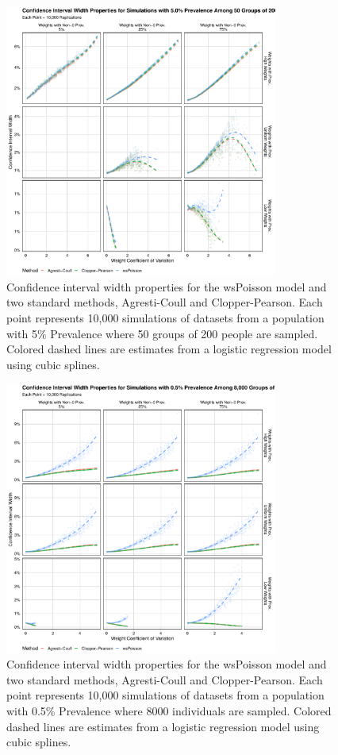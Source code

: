 \documentclass[AMA,STIX1COL]{WileyNJD-v2}
\begin{document}
\begin{figure}
\centering
\includegraphics[width=0.8\textwidth]{figures/perfect_confidence_interval_width_50_groups_0_05_prev}
\caption{Confidence interval width properties for the wsPoisson model and two standard methods, Agresti-Coull and Clopper-Pearson.
Each point represents 10,000 simulations of datasets from a population with 5\% Prevalence where 50 groups of 200 people are sampled.
Colored dashed lines are estimates from a logistic regression model using cubic splines.}
\label{fig:perfect_confidence_interval_width_50_groups_0_05_prev}
\end{figure}


\begin{figure}
\centering
\includegraphics[width=0.8\textwidth]{figures/perfect_confidence_interval_width_8000_groups_0_005_prev}
\caption{Confidence interval width properties for the wsPoisson model and two standard methods, Agresti-Coull and Clopper-Pearson.
Each point represents 10,000 simulations of datasets from a population with 0.5\% Prevalence where 8000 individuals are sampled.
Colored dashed lines are estimates from a logistic regression model using cubic splines.}
\label{fig:perfect_confidence_interval_width_8000_groups_0_005_prev}
\end{figure}
\end{document}
